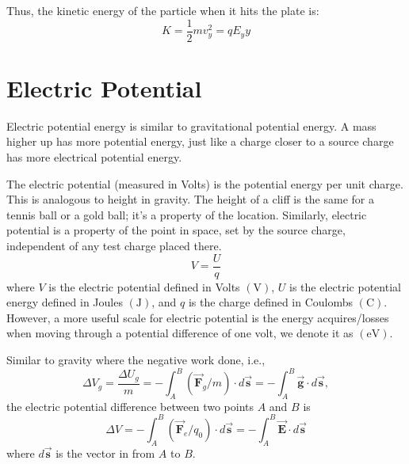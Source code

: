 Thus, the kinetic energy of the particle when it hits the plate is:
\begin{equation*}
  K = \frac{1}{2}mv_y^2 = qE_yy
\end{equation*}







\section{Electric Potential}
Electric potential energy is similar to gravitational potential energy. A mass higher up has more potential energy, just like a charge closer to a source charge has more electrical potential energy.

The electric potential (measured in Volts) is the potential energy per unit charge. This is analogous to height in gravity. The height of a cliff is the same for a tennis ball or a gold ball; it's a property of the location. Similarly, electric potential is a property of the point in space, set by the source charge, independent of any test charge placed there.
\begin{equation*}
  V=\frac{U}{q}
\end{equation*}
where $V$ is the electric potential defined in Volts $(\si{\volt})$, $U$ is the electric potential energy defined in Joules $(\si{\joule})$, and $q$ is the charge defined in Coulombs $(\si{\coulomb})$.
However, a more useful scale for electric potential is the energy acquires/losses when moving through a potential difference of one volt, we denote it as $(\si{\electronvolt})$.

Similar to gravity where the negative work done, i.e.,
\begin{equation*}
  \Delta V_g = \frac{\Delta U_g}{m} = -\int_A^B(\vec{\boldsymbol{F}}_g/m)\cdot d\vec{\boldsymbol{s}} = - \int_A^B\vec{\boldsymbol{g}}\cdot d\vec{\boldsymbol{s}},
\end{equation*}
the electric potential difference between two points $A$ and $B$ is 
\begin{equation}\label{eq:electric-potential-difference}
  \Delta V = -\int_A^B(\vec{\boldsymbol{F}}_e/q_0)\cdot d\vec{\boldsymbol{s}} = -\int_A^B\vec{\boldsymbol{E}}\cdot d\vec{\boldsymbol{s}}
\end{equation}
where $d\vec{\boldsymbol{s}}$ is the vector in from $A$ to $B$.


